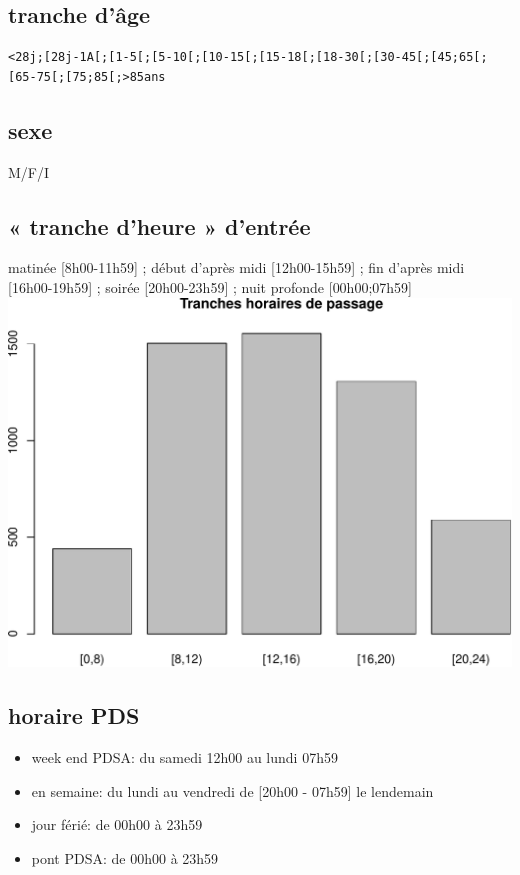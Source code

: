 \documentclass[]{article}
\begin{document}
\subsection{tranche d'âge}\label{tranche-dage}

\begin{verbatim}
<28j;[28j-1A[;[1-5[;[5-10[;[10-15[;[15-18[;[18-30[;[30-45[;[45;65[;[65-75[;[75;85[;>85ans
\end{verbatim}

\subsection{sexe}\label{sexe-1}

M/F/I

\subsection{« tranche d'heure » d'entrée}\label{tranche-dheure-dentree}

matinée {[}8h00-11h59{]} ; début d'après midi {[}12h00-15h59{]} ; fin
d'après midi {[}16h00-19h59{]} ; soirée {[}20h00-23h59{]} ; nuit
profonde {[}00h00;07h59{]}
\includegraphics{rapport_2014_files/figure-latex/tranches_heure_entree-1.pdf}

\subsection{horaire PDS}\label{horaire-pds}

\begin{itemize}
\itemsep1pt\parskip0pt
\item
  week end PDSA: du samedi 12h00 au lundi 07h59
\item
  en semaine: du lundi au vendredi de {[}20h00 - 07h59{]} le lendemain
\item
  jour férié: de 00h00 à 23h59
\item
  pont PDSA: de 00h00 à 23h59
\end{itemize}
\end{document}
